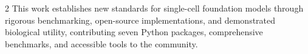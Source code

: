 \begin{mdframed}
\begin{small}
\begin{multicols}{2}
This work establishes new standards for single-cell foundation models through rigorous benchmarking, open-source implementations, and demonstrated biological utility, contributing seven Python packages, comprehensive benchmarks, and accessible tools to the community.

\end{multicols}
\end{small}
\end{mdframed}

